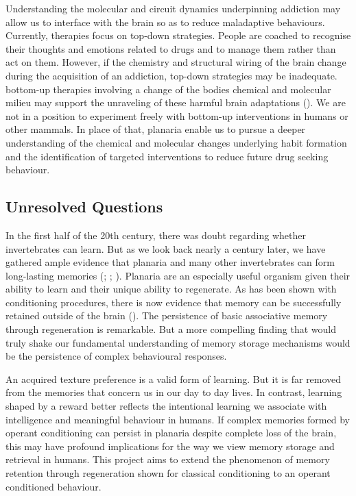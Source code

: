 \documentclass[
  jou,
  floatsintext,
  longtable,
  nolmodern,
  notxfonts,
  notimes,
  donotrepeattitle,
  colorlinks=true,linkcolor=blue,citecolor=blue,urlcolor=blue]{apa7}
\begin{document}
Understanding the molecular and circuit dynamics underpinning addiction
may allow us to interface with the brain so as to reduce maladaptive
behaviours. Currently, therapies focus on top-down strategies. People
are coached to recognise their thoughts and emotions related to drugs
and to manage them rather than act on them. However, if the chemistry
and structural wiring of the brain change during the acquisition of an
addiction, top-down strategies may be inadequate. bottom-up therapies
involving a change of the bodies chemical and molecular milieu may
support the unraveling of these harmful brain adaptations
(). We are
not in a position to experiment freely with bottom-up interventions in
humans or other mammals. In place of that, planaria enable us to pursue
a deeper understanding of the chemical and molecular changes underlying
habit formation and the identification of targeted interventions to
reduce future drug seeking behaviour.

\subsection{Unresolved Questions}\label{unresolved-questions}

In the first half of the 20th century, there was doubt regarding whether
invertebrates can learn. But as we look back nearly a century later, we
have gathered ample evidence that planaria and many other invertebrates
can form long-lasting memories
(; ; ). Planaria are an
especially useful organism given their ability to learn and their unique
ability to regenerate. As has been shown with conditioning procedures,
there is now evidence that memory can be successfully retained outside
of the brain (). The persistence of basic associative memory through regeneration
is remarkable. But a more compelling finding that would truly shake our
fundamental understanding of memory storage mechanisms would be the
persistence of complex behavioural responses.

An acquired texture preference is a valid form of learning. But it is
far removed from the memories that concern us in our day to day lives.
In contrast, learning shaped by a reward better reflects the intentional
learning we associate with intelligence and meaningful behaviour in
humans. If complex memories formed by operant conditioning can persist
in planaria despite complete loss of the brain, this may have profound
implications for the way we view memory storage and retrieval in humans.
This project aims to extend the phenomenon of memory retention through
regeneration shown for classical conditioning to an operant conditioned
behaviour.
\end{document}
